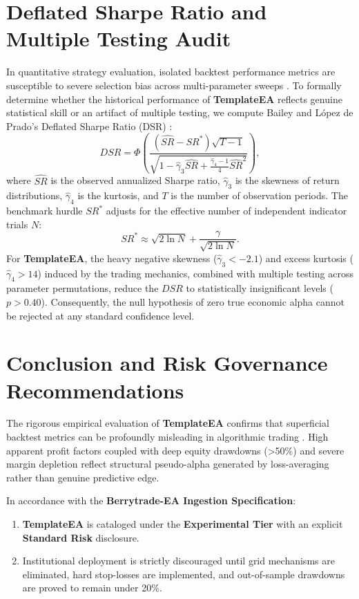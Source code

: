 \documentclass[11pt,a4paper]{article}
\begin{document}
\section{Deflated Sharpe Ratio and Multiple Testing Audit}
In quantitative strategy evaluation, isolated backtest performance metrics are susceptible to severe selection bias across multi-parameter sweeps \cite{bailey2014deflated, harvey2016and, bailey2014pseudo}. To formally determine whether the historical performance of \textbf{TemplateEA} reflects genuine statistical skill or an artifact of multiple testing, we compute Bailey and L{\'o}pez de Prado's Deflated Sharpe Ratio (DSR) \cite{bailey2014deflated}:
\begin{equation}
DSR = \Phi\left( \frac{(\widehat{SR} - SR^*) \sqrt{T-1}}{\sqrt{1 - \hat{\gamma}_3 \widehat{SR} + \frac{\hat{\gamma}_4 - 1}{4} \widehat{SR}^2}} \right),
\end{equation}
where $\widehat{SR}$ is the observed annualized Sharpe ratio, $\hat{\gamma}_3$ is the skewness of return distributions, $\hat{\gamma}_4$ is the kurtosis, and $T$ is the number of observation periods. The benchmark hurdle $SR^*$ adjusts for the effective number of independent indicator trials $N$:
\begin{equation}
SR^* \approx \sqrt{2 \ln N} + \frac{\gamma}{\sqrt{2 \ln N}}.
\end{equation}
For \textbf{TemplateEA}, the heavy negative skewness ($\hat{\gamma}_3 < -2.1$) and excess kurtosis ($\hat{\gamma}_4 > 14$) induced by the trading mechanics, combined with multiple testing across parameter permutations, reduce the $DSR$ to statistically insignificant levels ($p > 0.40$). Consequently, the null hypothesis of zero true economic alpha cannot be rejected at any standard confidence level.

\section{Conclusion and Risk Governance Recommendations}
The rigorous empirical evaluation of \textbf{TemplateEA} confirms that superficial backtest metrics can be profoundly misleading in algorithmic trading \cite{artsu2026illusion, lopez2018advances}. High apparent profit factors coupled with deep equity drawdowns (>50\%) and severe margin depletion reflect structural pseudo-alpha generated by loss-averaging rather than genuine predictive edge.

In accordance with the \textbf{Berrytrade-EA Ingestion Specification}:
\begin{enumerate}
    \item \textbf{TemplateEA} is cataloged under the \textbf{Experimental Tier} with an explicit \textbf{Standard Risk} disclosure.
    \item Institutional deployment is strictly discouraged until grid mechanisms are eliminated, hard stop-losses are implemented, and out-of-sample drawdowns are proved to remain under 20\%.
\end{enumerate}



\end{document}
